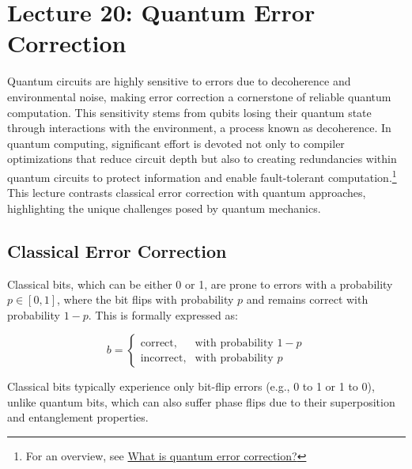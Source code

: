 \section{Lecture 20: Quantum Error Correction}\label{sec:lecture20}

Quantum circuits are highly sensitive to errors due to decoherence and
environmental noise, making error correction a cornerstone of reliable
quantum computation. This sensitivity stems from qubits losing their quantum
state through interactions with the environment, a process known as
decoherence. In quantum computing, significant effort is devoted not only to
compiler optimizations that reduce circuit depth but also to creating
redundancies within quantum circuits to protect information and enable
fault-tolerant computation.\footnote{For an overview, see
  \href{https://q-ctrl.com/topics/what-is-quantum-error-correction}{What is
quantum error correction?}} This lecture contrasts classical error correction
with quantum approaches, highlighting the unique challenges posed by quantum
mechanics.

\subsection*{Classical Error Correction}

Classical bits, which can be either 0 or 1, are prone to errors with a
probability \( p \in [0, 1] \), where the bit flips with probability \( p \)
and remains correct with probability \( 1 - p \). This is formally expressed as:

\[
  b =
  \begin{cases}
    \text{correct}, & \text{with probability } 1 - p \\
    \text{incorrect}, & \text{with probability } p
  \end{cases}
\]

Classical bits typically experience only bit-flip errors (e.g., 0 to 1 or 1
to 0), unlike quantum bits, which can also suffer phase flips due to their
superposition and entanglement properties.

